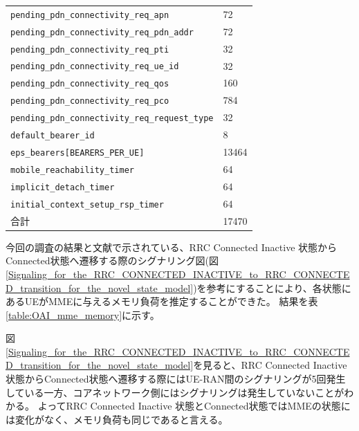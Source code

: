 \documentclass[a4j]{ujarticle}
\begin{document}
\begin{table}[htbp]
\begin{tabular}{l|l}
    \verb|pending_pdn_connectivity_req_apn| & 72\\
    \verb|pending_pdn_connectivity_req_pdn_addr| & 72\\
    \verb|pending_pdn_connectivity_req_pti| & 32\\
    \verb|pending_pdn_connectivity_req_ue_id| & 32\\
    \verb|pending_pdn_connectivity_req_qos| & 160\\
    \verb|pending_pdn_connectivity_req_pco| & 784\\
    \verb|pending_pdn_connectivity_req_request_type| & 32\\
    \verb|default_bearer_id| & 8\\
    \verb|eps_bearers[BEARERS_PER_UE]| & 13464\\
    \verb|mobile_reachability_timer| & 64\\
    \verb|implicit_detach_timer| & 64\\
    \verb|initial_context_setup_rsp_timer| & 64\\\hline%
    合計  & 17470\\\hline
  \end{tabular}
\end{table}

\clearpage
今回の調査の結果と文献\cite{ANovelStateModelfor5GRadioAccessNetworks}で示されている、RRC Connected Inactive 状態からConnected状態へ遷移する際のシグナリング図(図\ref{Signaling_for_the_RRC_CONNECTED_INACTIVE_to_RRC_CONNECTED_transition_for_the_novel_state_model})を参考にすることにより、各状態にあるUEがMMEに与えるメモリ負荷を推定することができた。
結果を表\ref{table:OAI_mme_memory}に示す。

図\ref{Signaling_for_the_RRC_CONNECTED_INACTIVE_to_RRC_CONNECTED_transition_for_the_novel_state_model}を見ると、RRC Connected Inactive 状態からConnected状態へ遷移する際にはUE-RAN間のシグナリングが5回発生している一方、コアネットワーク側にはシグナリングは発生していないことがわかる。
よってRRC Connected Inactive 状態とConnected状態ではMMEの状態には変化がなく、メモリ負荷も同じであると言える。
\end{document}
